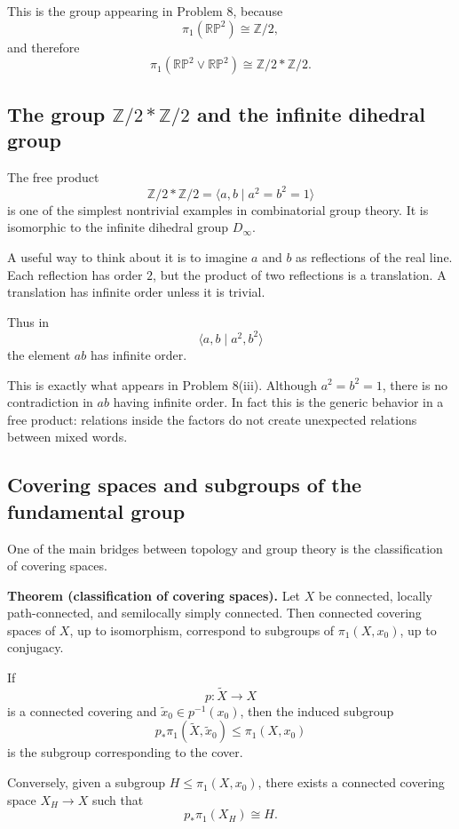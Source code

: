 \documentclass[12pt,a4paper]{article}
\theoremstyle{notespace}
\begin{document}
This is the group appearing in Problem 8, because
\[
\pi_1(\mathbb{RP}^2)\cong \mathbb Z/2,
\]
and therefore
\[
\pi_1(\mathbb{RP}^2\vee \mathbb{RP}^2)
\cong
\mathbb Z/2 * \mathbb Z/2.
\]

\subsection{The group \(\mathbb Z/2 * \mathbb Z/2\) and the infinite dihedral group}

The free product
\[
\mathbb Z/2 * \mathbb Z/2
=
\langle a,b\mid a^2=b^2=1\rangle
\]
is one of the simplest nontrivial examples in combinatorial group theory. It is isomorphic to the infinite dihedral group \(D_\infty\).

A useful way to think about it is to imagine \(a\) and \(b\) as reflections of the real line. Each reflection has order \(2\), but the product of two reflections is a translation. A translation has infinite order unless it is trivial.

Thus in
\[
\langle a,b\mid a^2,b^2\rangle
\]
the element \(ab\) has infinite order.

This is exactly what appears in Problem 8(iii). Although \(a^2=b^2=1\), there is no contradiction in \(ab\) having infinite order. In fact this is the generic behavior in a free product: relations inside the factors do not create unexpected relations between mixed words.

\subsection{Covering spaces and subgroups of the fundamental group}

One of the main bridges between topology and group theory is the classification of covering spaces.

\medskip

\textbf{Theorem (classification of covering spaces).}
Let \(X\) be connected, locally path-connected, and semilocally simply connected. Then connected covering spaces of \(X\), up to isomorphism, correspond to subgroups of \(\pi_1(X,x_0)\), up to conjugacy.

\medskip

If
\[
p:\widetilde X\to X
\]
is a connected covering and \(\widetilde x_0\in p^{-1}(x_0)\), then the induced subgroup
\[
p_*\pi_1(\widetilde X,\widetilde x_0)\leq \pi_1(X,x_0)
\]
is the subgroup corresponding to the cover.

Conversely, given a subgroup \(H\leq \pi_1(X,x_0)\), there exists a connected covering space \(X_H\to X\) such that
\[
p_*\pi_1(X_H)\cong H.
\]
\end{document}
